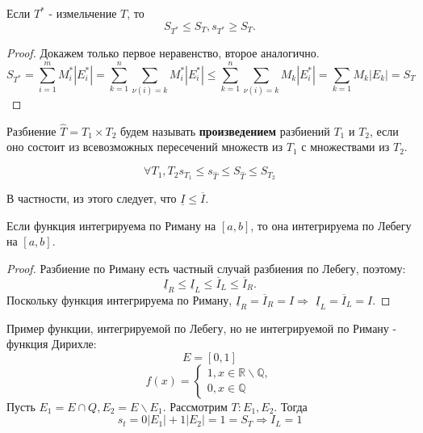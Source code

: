 \documentclass[11pt]{article}
\newcounter{stnmt}\setcounter{stnmt}{0}
\def\st{\par\smallskip\refstepcounter{stnmt}\textbf{\arabic{stnmt}}}
\newtheorem*{Statement}{Утверждение \st}
\newcounter{th}\setcounter{th}{0}
\def\th{\par\smallskip\refstepcounter{th}\textbf{\arabic{th}}}
\newtheorem*{Theorem}{Теорема \th}
\newcounter{cnsqnc}\setcounter{cnsqnc}{0}
\def\cnsqnc{\par\smallskip\refstepcounter{cnsqnc}\textbf{\arabic{cnsqnc}}}
\newtheorem*{Consequence}{Следствие \cnsqnc}
\begin{document}
\begin{Statement}
Если $T^*$ - измельчение $T$, то
\begin{equation}
S_{T^*} \leq S_T, s_{T^*} \geq S_T.
\end{equation}
\end{Statement}
\begin{proof}
Докажем только первое неравенство, второе аналогично.
\begin{equation}
S_{T^*} = \sum_{i = 1}^mM_i^*|E_i^*| = \sum_{k = 1}^n\sum_{\nu(i) = k}M_i^*|E_i^*| \leq
\sum_{k = 1}^n\sum_{\nu(i) = k}M_k|E_i^*| = \sum_{k = 1}M_k|E_k| = S_T
\end{equation}
\end{proof}
Разбиение $\hat{T} = T_1\times T_2$ будем называть \textbf{произведением} разбиений $T_1$ и
$T_2$, если оно состоит из всевозможных пересечений множеств из $T_1$ с множествами из $T_2$.
\begin{Consequence}
\begin{equation}
\forall T_1, T_2 s_{T_1} \leq s_{\hat{T}} \leq S_{\hat{T}} \leq S_{T_2}
\end{equation}
\end{Consequence}
В частности, из этого следует, что $\underline{I} \leq \overline{I}$.
\begin{Theorem}
Если функция интегрируема по Риману на $[a, b]$, то она интегрируема по Лебегу на $[a, b]$.
\end{Theorem}
\begin{proof}
Разбиение по Риману есть частный случай разбиения по Лебегу, поэтому:
\begin{equation}
\underline{I}_R \leq \underline{I}_L \leq \overline{I}_L \leq \overline{I}_R.
\end{equation}
Поскольку функция интегрируема по Риману, $\underline{I}_R = \overline{I}_R = I \Rightarrow$
$\underline{I}_L = \overline{I}_L = I$.
\end{proof}
Пример функции, интегрируемой по Лебегу, но не интегрируемой по Риману - функция Дирихле:
$$E = [0, 1]$$
\begin{equation}
f(x) = \begin{cases}
1, x \in \mathbb{R} \backslash \mathbb{Q}, \\
0, x \in \mathbb{Q}
\end{cases}
\end{equation}
Пусть $E_1 = E \cap Q, E_2 = E \backslash E_1$. Рассмотрим $T: {E_1, E_2}$. Тогда
\begin{equation}
s_t = 0|E_1| + 1|E_2| = 1 = S_T \Rightarrow I_L = 1
\end{equation}
\end{document}
